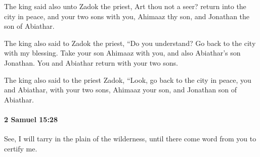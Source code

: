 			\begin{versebox}
					\item[BHS] 
					\item[ASV] The king said also unto Zadok the priest, Art thou not a seer? return into the city in peace, and your two sons with you, Ahimaaz thy son, and Jonathan the son of Abiathar.
					\item[NIV] The king also said to Zadok the priest, “Do you understand? Go back to the city with my blessing. Take your son Ahimaaz with you, and also Abiathar’s son Jonathan. You and Abiathar return with your two sons.
					\item[NRSV] The king also said to the priest Zadok, “Look, go back to the city in peace, you and Abiathar, with your two sons, Ahimaaz your son, and Jonathan son of Abiathar.
			\end{versebox}

		\paragraph{2 Samuel 15:28} %
			\label{2SAMUEL-15-28}

			See, I will tarry in the plain of the wilderness, until there come word from you to certify me.

